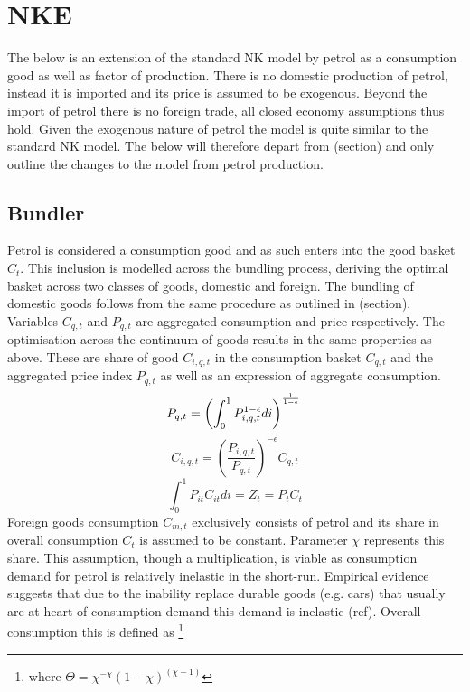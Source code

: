 \documentclass[12pt,a4paper,english]{article} %
\let\oldsection\section
\renewcommand\section{\clearpage\oldsection}
\begin{document}

	\section{NKE}
	The below is an extension of the standard NK model by petrol as a consumption good as well as factor of production. There is no domestic production of petrol, instead it is imported and its price is assumed to be exogenous. Beyond the import of petrol there is no foreign trade, all closed economy assumptions thus hold. 
	Given the exogenous nature of petrol the model is quite similar to the standard NK model. The below will therefore depart from (section) and only outline the changes to the model from petrol production. 	
	
	\subsection{Bundler}
	Petrol is considered a consumption good and as such enters into the good basket $C_t$. This inclusion is modelled across the bundling process, deriving the optimal basket across two classes of goods, domestic and foreign. 
	The bundling of domestic goods follows from the same procedure as outlined in (section). Variables $C_{q,t}$ and $P_{q,t}$ are aggregated consumption and price respectively. The optimisation across the continuum of goods results in the same properties as above. These are share of good $C_{i,q,t}$ in the consumption basket $C_{q,t}$ and the aggregated price index $P_{q,t}$ as well as an expression of aggregate consumption. \\
	\begin{equation} \label{eq:o_pindex}
		P_{q,t} = \left( \int_{0}^{1} P_{i,q,t}^{1 - \epsilon} di \right)^{\frac{1}{1-\epsilon}} \\
	\end{equation}
	\begin{equation} \label{eq:o_cshare}
		C_{i,q,t} = \left( \frac{P_{i,q,t}}{P_{q,t}} \right)^{-\epsilon} C_{q,t}
	\end{equation}
	\begin{equation} \label{eq:o_pcon}
		\int_{0}^{1} P_{it} C_{it} di = Z_t = P_t C_t
	\end{equation}
	Foreign goods consumption $C_{m,t}$ exclusively consists of petrol and its share in overall consumption $C_t$ is assumed to be constant. Parameter $\chi$ represents this share. 
	This assumption, though a multiplication, is viable as consumption demand for petrol is relatively inelastic in the short-run. Empirical evidence suggests that due to the inability replace durable goods (e.g. cars) that usually are at heart of consumption demand this demand is inelastic (ref). Overall consumption this is defined as \footnote{where $\Theta = \chi^{-\chi}(1-\chi)^{(\chi-1)}$}
\end{document}

